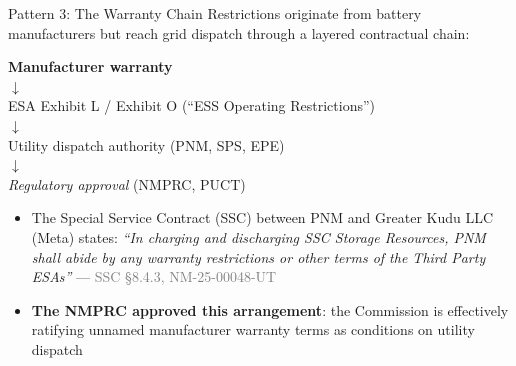 \begin{frame}{Pattern 3: The Warranty Chain}
Restrictions originate from battery manufacturers but reach grid dispatch through a layered contractual chain:

\vspace{0.3cm}
\begin{center}
\textbf{Manufacturer warranty}\\
$\downarrow$\\
ESA Exhibit L / Exhibit O (``ESS Operating Restrictions'')\\
$\downarrow$\\
Utility dispatch authority (PNM, SPS, EPE)\\
$\downarrow$\\
\textit{Regulatory approval} (NMPRC, PUCT)
\end{center}

\vspace{0.3cm}
\begin{itemize}
    \item The Special Service Contract (SSC) between PNM and Greater Kudu LLC (Meta) states: \textit{``In charging and discharging SSC Storage Resources, PNM shall abide by any warranty restrictions or other terms of the Third Party ESAs''} --- \textcolor{gray}{SSC \S8.4.3, NM-25-00048-UT}
    \item \textbf{The NMPRC approved this arrangement}: the Commission is effectively ratifying unnamed manufacturer warranty terms as conditions on utility dispatch
\end{itemize}
\end{frame}

